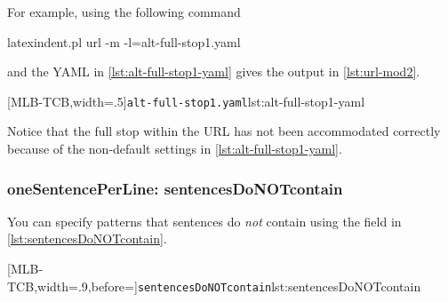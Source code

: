 \documentclass[10pt]{article}
\begin{document}
 \begin{example}
 For example, using the following command 

 \begin{commandshell}
latexindent.pl url -m -l=alt-full-stop1.yaml
\end{commandshell}

 and the YAML in \cref{lst:alt-full-stop1-yaml} gives the output in \cref{lst:url-mod2}.

 \begin{cmhtcbraster}[ raster left skip=-3.5cm,
   raster right skip=-2cm,
   raster force size=false,
   raster column 1/.style={add to width=.1\textwidth},
   raster column skip=.06\linewidth]
  [MLB-TCB,width=.5\textwidth]{\texttt{alt-full-stop1.yaml}}{lst:alt-full-stop1-yaml}
 \end{cmhtcbraster}

 Notice that the full stop within the URL has not been accommodated correctly because of
 the non-default settings in \cref{lst:alt-full-stop1-yaml}.
 \end{example}

\subsubsection{oneSentencePerLine: sentencesDoNOTcontain}
 You can specify patterns that sentences do \emph{not} contain using the field
  in
 \cref{lst:sentencesDoNOTcontain}.

 [MLB-TCB,width=.9\linewidth,before=\centering]{\texttt{sentencesDoNOTcontain}}{lst:sentencesDoNOTcontain}
\end{document}
